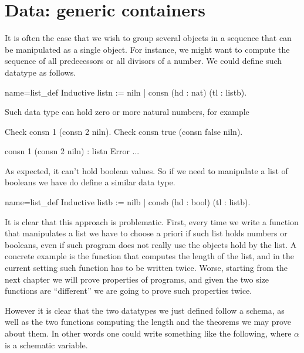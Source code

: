 \section{Data: generic containers}

It is often the case that we wish to group several objects in a
sequence that can be manipulated as a single object.  For instance, we
might want to compute the sequence of all predecessors or all divisors
of a number.  We could define such datatype as follows.

\begin{coq}{name=list_def}{}
Inductive listn := niln | consn (hd : nat) (tl : listb).
\end{coq}

Such data type can hold zero or more natural numbers, for example

\begin{coq}{}{}
Check consn 1 (consn 2 niln).
Check consn true (consn false niln).
\end{coq}{}{}
\begin{coqout}{}{}
 consn 1 (consn 2 niln) : listn
 Error ...
\end{coqout}{}{}

As expected, it can't hold boolean values.  So if we need to
manipulate a list of booleans we have do define a similar data type.

\begin{coq}{name=list_def}{}
Inductive listb := nilb | consb (hd : bool) (tl : listb).
\end{coq}

It is clear that this approach is problematic.  First, every time we
write a function that manipulates a list we have to choose a priori
if such list holds numbers or booleans, even if such program does not
really use the objects hold by the list.
A concrete example is the function that computes the length of the list,
and in the current setting such function has to be written twice.
Worse, starting from the next chapter we will prove properties of programs,
and given the two size functions are ``different'' we are going to prove such
properties twice.

However it is clear that the two datatypes we just defined follow
a schema, as well as the two functions computing the length and the
theorems we may prove about them.  In other words one could write something
like the following, where $\alpha$ is a schematic variable.

